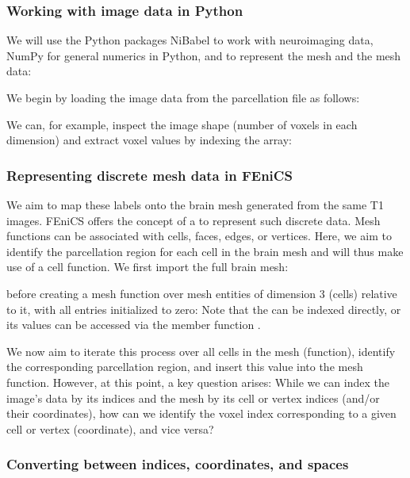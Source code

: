 \subsubsection*{Working with image data in Python}

We will use the Python packages NiBabel to work %
with neuroimaging data, NumPy for general numerics in Python, and {\fenics} to 
represent the mesh and the mesh data:

\noindent We begin by loading the image data from the parcellation
file as follows:

\noindent We can, for example, inspect the image shape (number of voxels in
each dimension) and extract voxel values by indexing the
 array:

\subsubsection*{Representing discrete mesh data in FEniCS}
We aim to map these labels onto the brain mesh generated from the same
T1 images. FEniCS offers the concept of a  to
represent such discrete data. Mesh functions can be associated with
cells, faces, edges, or vertices. Here, we aim to identify the
parcellation region for each cell in the brain mesh and will thus
make use of a cell function. We first import the full brain mesh:

\noindent before creating a mesh function over mesh entities of
dimension 3 (cells) relative to it, with all entries initialized to zero:
Note that the  can be indexed directly, or its values can be
accessed via the member function .

We now aim to iterate this process over all cells in the mesh (function), identify the
corresponding parcellation region, and insert this value into the 
mesh function. However, at this point, a key question arises: While we can
index the image's data by its indices and the mesh by its cell or vertex
indices (and/or their coordinates), how can we identify the voxel
index corresponding to a given cell or vertex (coordinate), and vice
versa? 

\subsubsection*{Converting between indices, coordinates, and spaces}

